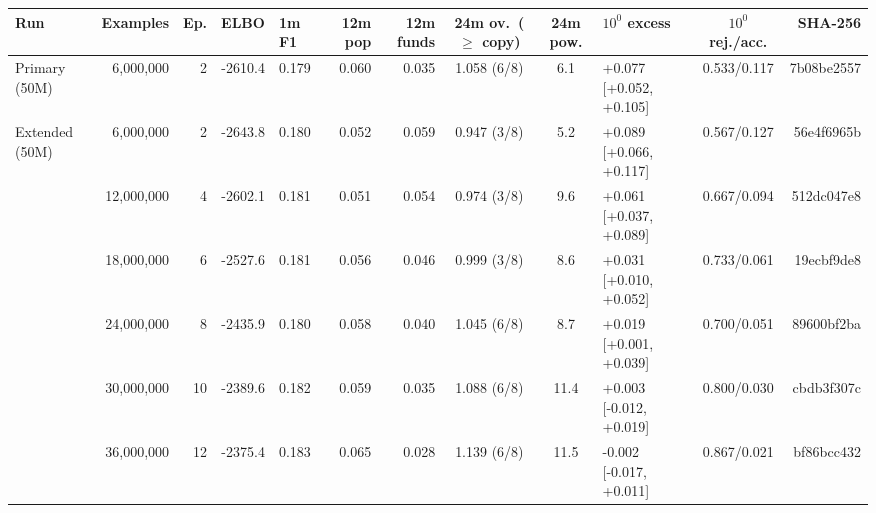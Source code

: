 \setlength{\tabcolsep}{1.5pt}
\begin{tabular*}{\textwidth}{@{\extracolsep{\fill}}lrrrlrrcclcr@{}}
\toprule
Run & Examples & Ep. & ELBO & 1m F1 & 12m pop & 12m funds & 24m ov.\ ($\ge$ copy) & 24m pow. & $10^{0}$ excess & $10^{0}$ rej./acc. & SHA-256 \\
\midrule
Primary (50M) & 6,000,000 & 2 & \mbox{-}2610.4 & 0.179 & 0.060 & 0.035 & 1.058 (6/8) & 6.1 & +0.077 {\tiny[+0.052, +0.105]} & 0.533/0.117 & 7b08be2557 \\
\midrule
Extended (50M) & 6,000,000 & 2 & \mbox{-}2643.8 & 0.180 & 0.052 & 0.059 & 0.947 (3/8) & 5.2 & +0.089 {\tiny[+0.066, +0.117]} & 0.567/0.127 & 56e4f6965b \\
 & 12,000,000 & 4 & \mbox{-}2602.1 & 0.181 & 0.051 & 0.054 & 0.974 (3/8) & 9.6 & +0.061 {\tiny[+0.037, +0.089]} & 0.667/0.094 & 512dc047e8 \\
 & 18,000,000 & 6 & \mbox{-}2527.6 & 0.181 & 0.056 & 0.046 & 0.999 (3/8) & 8.6 & +0.031 {\tiny[+0.010, +0.052]} & 0.733/0.061 & 19ecbf9de8 \\
 & 24,000,000 & 8 & \mbox{-}2435.9 & 0.180 & 0.058 & 0.040 & 1.045 (6/8) & 8.7 & +0.019 {\tiny[+0.001, +0.039]} & 0.700/0.051 & 89600bf2ba \\
 & 30,000,000 & 10 & \mbox{-}2389.6 & 0.182 & 0.059 & 0.035 & 1.088 (6/8) & 11.4 & +0.003 {\tiny[\mbox{-}0.012, +0.019]} & 0.800/0.030 & cbdb3f307c \\
 & 36,000,000 & 12 & \mbox{-}2375.4 & 0.183 & 0.065 & 0.028 & 1.139 (6/8) & 11.5 & \mbox{-}0.002 {\tiny[\mbox{-}0.017, +0.011]} & 0.867/0.021 & bf86bcc432 \\
\bottomrule
\end{tabular*}

